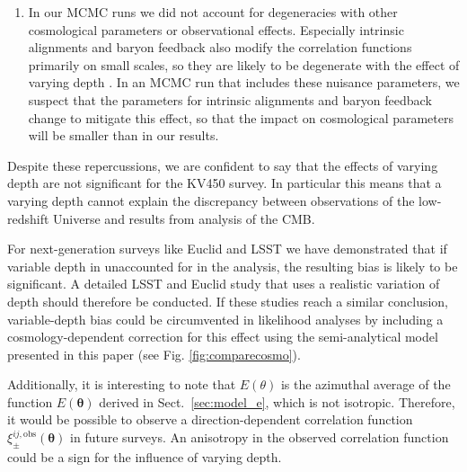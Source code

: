 \documentclass{aa}
\renewcommand{\rm}{\mathrm}
\def\b#1{\bm{#1}}
\begin{document}
\begin{enumerate}
\item In our MCMC runs we did not account for degeneracies with other cosmological parameters or observational effects. Especially intrinsic alignments and baryon feedback also modify the correlation functions primarily on small scales, so they are likely to be degenerate with the effect of varying depth \citep{Troxel:2015}. In an MCMC run that includes these nuisance parameters, we suspect that the parameters for intrinsic alignments and baryon feedback change to mitigate this effect, so that the impact on cosmological parameters will be smaller than in our results. %
\end{enumerate}

Despite these repercussions, we are confident to say that the effects of varying depth are not significant for the KV450 survey. In particular this means that a varying depth cannot explain the discrepancy between observations of the low-redshift Universe and results from analysis of the CMB.

For next-generation surveys like Euclid and LSST we have demonstrated that if variable depth in unaccounted for in the analysis, the resulting bias is likely to be significant. A detailed LSST and Euclid study that uses a realistic variation of depth should therefore be conducted. If these studies reach a similar conclusion, variable-depth bias could be circumvented in likelihood analyses by including a cosmology-dependent correction for this effect using the semi-analytical model presented in this paper (see Fig. \ref{fig:comparecosmo}).

Additionally, it is interesting to note that $E(\theta)$ is the azimuthal average of the function $E(\b\theta)$ derived in Sect.~\ref{sec:model_e}, which is not isotropic. Therefore, it would be possible to observe a direction-dependent correlation function $\xi_\pm^{ij,\rm{obs}}(\b\theta)$ in future surveys. An anisotropy in the observed correlation function could be a sign for the influence of varying depth.
\end{document}
